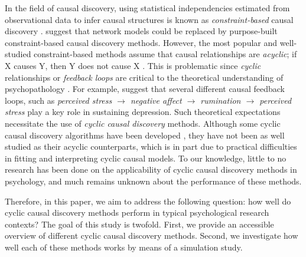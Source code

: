 \documentclass[11pt]{article}
\begin{document}
In the field of causal discovery, using statistical independencies estimated from observational data to infer causal structures is known as \textit{constraint-based} causal discovery \citep{spirtes_algorithm_1991}. \cite{Ryan2022} suggest that network models could be replaced by purpose-built constraint-based causal discovery methods. However, the most popular and well-studied constraint-based methods assume that causal relationships are \textit{acyclic}; if X causes Y, then Y does not cause X \citep{Glymour2019}. This is problematic since \textit{cyclic} relationships or \textit{feedback loops} are critical to the theoretical understanding of psychopathology \citep{borsboom_network_2017}. For example, \cite{wittenborn_2016} suggest that several different causal feedback loops, such as \textit{perceived stress $\rightarrow$ negative affect $\rightarrow$ rumination $\rightarrow$ perceived stress} play a key role in sustaining depression. Such theoretical expectations necessitate the use of \textit{cyclic causal discovery} methods. Although some cyclic causal discovery algorithms have been developed \citep{mooij_classen2020}, they have not been as well studied as their acyclic counterparts, which is in part due to practical difficulties in fitting and interpreting cyclic causal models. To our knowledge, little to no research has been done on the applicability of cyclic causal discovery methods in psychology, and much remains unknown about the performance of these methods.

Therefore, in this paper, we aim to address the following question: how well do
cyclic causal discovery methods perform in typical psychological research contexts? The goal of this study is twofold. First, we provide an accessible overview of different cyclic causal discovery methods. Second, we investigate how well each of these methods works by means of a simulation study.  
\end{document}
